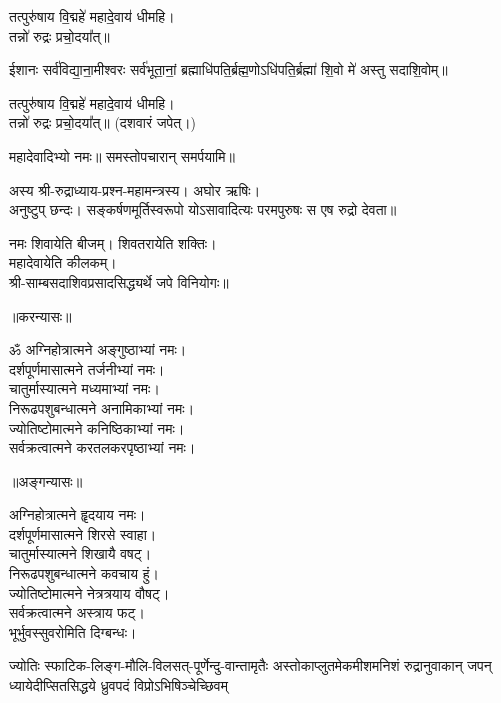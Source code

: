 तत्पुरु॑षाय वि॒द्महे॑ महादे॒वाय॑ धीमहि।\\
तन्नो॑ रुद्रः प्रचो॒दया᳚त्॥

ईशानः सर्व॑विद्या॒ना॒मीश्वरः सर्व॑भूता॒नां॒ ब्रह्माधि॑पति॒र्ब्रह्म॒णो\-ऽधि॑पति॒र्ब्रह्मा॑ शि॒वो मे॑ अस्तु सदाशि॒वोम्॥

तत्पुरु॑षाय वि॒द्महे॑ महादे॒वाय॑ धीमहि।\\
तन्नो॑ रुद्रः प्रचो॒दया᳚त्॥ (दशवारं जपेत्।)

महादेवादिभ्यो नमः॥ समस्तोपचारान् समर्पयामि॥

{\small\closesection}


{\small\closesection}


अस्य श्री-रुद्राध्याय-प्रश्न-महामन्त्रस्य। अघोर ऋषिः।\\
अनुष्टुप् छन्दः। सङ्कर्षणमूर्तिस्वरूपो योऽसावादित्यः परमपुरुषः स एष रुद्रो देवता॥

नमः शिवायेति बीजम्। शिवतरायेति शक्तिः।\\
महादेवायेति कीलकम्।\\
श्री-साम्बसदाशिवप्रसादसिद्ध्यर्थे जपे विनियोगः॥\\

\centerline{॥करन्यासः॥}
ॐ अग्निहोत्रात्मने अङ्गुष्ठाभ्यां नमः।\\
दर्शपूर्णमासात्मने तर्जनीभ्यां नमः।\\
चातुर्मास्यात्मने मध्यमाभ्यां नमः।\\
निरूढपशुबन्धात्मने अनामिकाभ्यां नमः।\\
ज्योतिष्टोमात्मने कनिष्ठिकाभ्यां नमः।\\
सर्वक्रत्वात्मने करतलकरपृष्ठाभ्यां नमः।\\

\centerline{॥अङ्गन्यासः॥}
अग्निहोत्रात्मने हॄदयाय नमः।\\
दर्शपूर्णमासात्मने शिरसे स्वाहा।\\
चातुर्मास्यात्मने शिखायै वषट्।\\
निरूढपशुबन्धात्मने कवचाय हुं।\\
ज्योतिष्टोमात्मने नेत्रत्रयाय वौषट्।\\
सर्वक्रत्वात्मने अस्त्राय फट्।\\
भूर्भुवस्सुवरोमिति दिग्बन्धः।\\

\begingroup
\setlength{\shlokaspaceskip}{2pt}

{ज्योतिः स्फाटिक-लिङ्ग-मौलि-विलसत्-पूर्णेन्दु-वान्तामृतैः}
{अस्तोकाप्लुतमेकमीशमनिशं रुद्रानुवाकान् जपन्}
{ध्यायेदीप्सितसिद्धये ध्रुवपदं विप्रोऽभिषिञ्चेच्छिवम्}

